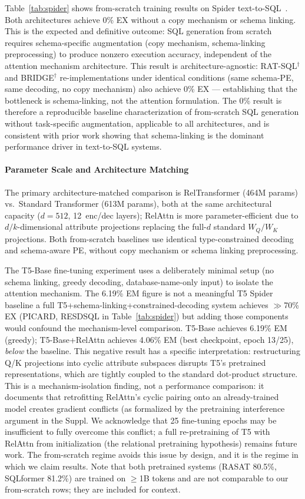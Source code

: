 \documentclass[conference]{IEEEtran}
\begin{document}
Table~\ref{tab:spider} shows from-scratch training results on Spider text-to-SQL~\cite{yu2018spider}. Both architectures achieve 0\% EX without a copy mechanism or schema linking. This is the expected and definitive outcome: SQL generation from scratch requires schema-specific augmentation (copy mechanism, schema-linking preprocessing) to produce nonzero execution accuracy, independent of the attention mechanism architecture. This result is architecture-agnostic: RAT-SQL$^\dagger$ and BRIDGE$^\dagger$ re-implementations under identical conditions (same schema-PE, same decoding, no copy mechanism) also achieve 0\% EX --- establishing that the bottleneck is schema-linking, not the attention formulation. The 0\% result is therefore a reproducible baseline characterization of from-scratch SQL generation without task-specific augmentation, applicable to all architectures, and is consistent with prior work showing that schema-linking is the dominant performance driver in text-to-SQL systems.

\paragraph{Parameter Scale and Architecture Matching}
The primary architecture-matched comparison is RelTransformer (464M params) vs.\ Standard Transformer (613M params), both at the same architectural capacity ($d{=}512$, 12~enc/dec layers); RelAttn is more parameter-efficient due to $d/k$-dimensional attribute projections replacing the full-$d$ standard $W_Q/W_K$ projections. Both from-scratch baselines use identical type-constrained decoding and schema-aware PE, without copy mechanism or schema linking preprocessing.

The T5-Base fine-tuning experiment uses a deliberately minimal setup (no schema linking, greedy decoding, database-name-only input) to isolate the attention mechanism. {The 6.19\% EM figure is not a meaningful T5 Spider baseline} a full T5+schema-linking+constrained-decoding system achieves $\gg$70\% EX (PICARD, RESDSQL in Table~\ref{tab:spider}) but adding those components would confound the mechanism-level comparison. T5-Base achieves 6.19\% EM (greedy); T5-Base+RelAttn achieves 4.06\% EM (best checkpoint, epoch 13/25), \emph{below} the baseline. This negative result has a specific interpretation: restructuring Q/K projections into cyclic attribute subspaces disrupts T5's pretrained representations, which are tightly coupled to the standard dot-product structure. This is a {mechanism-isolation finding}, not a performance comparison: it documents that retrofitting RelAttn's cyclic pairing onto an already-trained model creates gradient conflicts (as formalized by the pretraining interference argument in the Suppl. We acknowledge that 25 fine-tuning epochs may be insufficient to fully overcome this conflict; a full re-pretraining of T5 with RelAttn from initialization (the relational pretraining hypothesis) remains future work. The from-scratch regime avoids this issue by design, and it is the regime in which we claim results. Note that both pretrained systems (RASAT 80.5\%, SQLformer 81.2\%) are trained on $\geq$1B tokens and are not comparable to our from-scratch rows; they are included for context.
\end{document}
